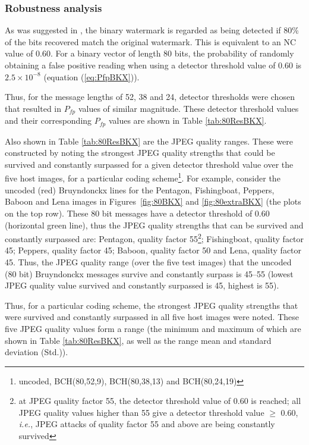 \documentclass[12pt]{report}
\begin{document}
\subsubsection{Robustness analysis}
As was suggested in \cite{petit99}, the binary watermark is regarded as being detected if 80\% of the bits recovered match the
original watermark. 
This is equivalent to an NC value of 0.60. For a binary vector
of length 80 bits, the probability of randomly obtaining a false positive reading when using a detector threshold value
of 0.60 is $2.5 \times 10^{-8}$ (equation (\ref{eq:PfpBKX})).

Thus, for the message lengths of 52, 38 and 24, detector thresholds were chosen that resulted in $P_{fp}$ values of similar magnitude.
These detector threshold values and their corresponding $P_{fp}$ values are shown in Table \ref{tab:80ResBKX}.

Also shown in Table \ref{tab:80ResBKX} are the JPEG quality ranges. These were constructed by noting 
the strongest JPEG quality
strengths that could be survived and constantly surpassed for a given detector threshold value over
the five host images, for a particular coding
scheme\footnote{uncoded, BCH(80,52,9), BCH(80,38,13) and BCH(80,24,19)}. 
For example, consider the uncoded (red) Bruyndonckx lines for the Pentagon, Fishingboat, Peppers,
Baboon and Lena images in Figures~\ref{fig:80BKX} and \ref{fig:80extraBKX} (the plots on the top row). These 80 bit messages
have a detector threshold of 0.60 (horizontal green line), thus the JPEG quality strengths that can be survived and constantly surpassed are:
Pentagon, quality factor 55\footnote{at JPEG quality factor 55, the detector threshold value of 0.60 is reached; all JPEG quality values
higher than 55 give a detector threshold value $\geq$ 0.60, \emph{i.e.}, JPEG attacks of quality factor 55 and above are being constantly
survived}; 
Fishingboat, quality factor 45; Peppers, quality factor 45; Baboon, quality factor 50 and Lena, quality factor 45. Thus, the JPEG 
quality range (over the five test images) that the uncoded (80 bit) Bruyndonckx messages survive and constantly surpass is
45--55 (lowest JPEG quality value survived and constantly surpassed is 45, highest is 55).

Thus, for a particular coding scheme, the strongest JPEG quality strengths that were survived and
constantly surpassed
in all five host images
were noted. These five JPEG quality values form a range (the minimum and maximum
of which
are shown in Table \ref{tab:80ResBKX}, as well as the range mean and standard deviation (Std.)).
\end{document}
